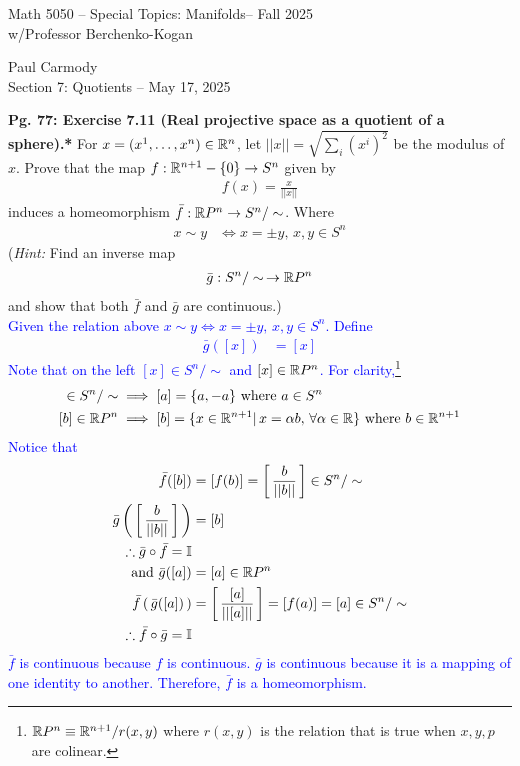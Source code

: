 \documentclass[10pt,a4paper]{report}
\newcommand{\CLASSNAME}{Math 5050 -- Special Topics: Manifolds}
\newcommand{\STUDENTNAME}{Paul Carmody}
\newcommand{\ASSIGNMENT}{Section 7: Quotients }
\newcommand{\DUEDATE}{May 17, 2025}
\newcommand{\PROFESSOR}{Professor Berchenko-Kogan}
\newcommand{\SEMESTER}{Fall 2025}
\newcommand{\BLUE}[1]{\textcolor{blue}{#1}}
\begin{document}
\begin{center}
	\Large{\CLASSNAME -- \SEMESTER} \\
	\large{ w/\PROFESSOR}
\end{center}
\begin{center}
	\STUDENTNAME \\
	\ASSIGNMENT -- \DUEDATE\\
\end{center} 

\noindent\textbf{Pg. 77: Exercise 7.11 (Real projective space as a quotient of a sphere).*}  For $x=(x^1,\dots,x^n)\in \mathbb{R}^n$, let $||x|| = \sqrt{\sum_i(x^i)^2}$ be the modulus of $x$.  Prove that the map $f: \mathbb{R}^{n+1} - \{0\} \to S^n$ given by 
\begin{align*}
	f(x) = \frac{x}{||x||}
\end{align*}induces a homeomorphism $\bar{f}: \mathbb{R} P^n\to S^n/\sim$.  Where
\begin{align*}
	x \sim y &\iff x=\pm y, \, x,y \in S^n
\end{align*} (\textit{Hint: } Find an inverse map 
\begin{align*}
	\bar{g}: S^n/\sim \,\to \mathbb{R} P^n
\end{align*}and show that both $\bar{f}$ and $\bar{g}$ are continuous.)\\

\BLUE{Given the relation above $x \sim y \iff x=\pm y,\, x,y \in S^n$.  Define
	\begin{align*}
		\bar{g}([x]) &= [x] 
	\end{align*}Note that on the left $[x] \in S^n/\sim$ and $[x] \in \mathbb{R} P^n$.  For clarity,\footnote{$\mathbb{R} P^n \equiv \mathbb{R}^{n+1}/r(x,y)$ where $r(x,y)$ is the relation that is true when $x,y,p$ are colinear.} 
	\begin{align*}
		[a] \in S^n/\sim &\implies [a] = \{ a, -a\} \WHERE a \in S^n\\
		[b] \in \R P^n &\implies [b] = \{x \in \R^{n+1}|\, x=\alpha b,\, \forall \alpha \in \R\} \WHERE b \in \R^{n+1} 
	\end{align*}Notice that
	\begin{align*}
		\bar{f}([b]) &= [f(b)] = \left [\, \frac{b}{||b||} \,\right ] \in S^n/\sim \\
		\bar{g}\left (\, \left [\, \frac{b}{||b||} \,\right ] \,\right ) &= [b] \\
		\therefore \bar{g}\circ\bar{f} = \mathbb{I}\\
		\text{ and } \bar{g}([a]) &= [a] \in \mathbb{R} P^n \\
		\bar{f}\left (\, \bar{g}([a]) \,\right ) &= \left [\, \frac{[a]}{|| [a]||} \,\right ] = [f(a)] = [a] \in S^n/\sim\\
		\therefore \bar{f}\circ\bar{g} = \mathbb{I}
	\end{align*} $\bar{f}$ is continuous because $f$ is continuous.  $\bar{g}$ is continuous because it is a mapping of one identity to another.  Therefore, $\bar{f}$ is a homeomorphism.
	}
	
\end{document}
